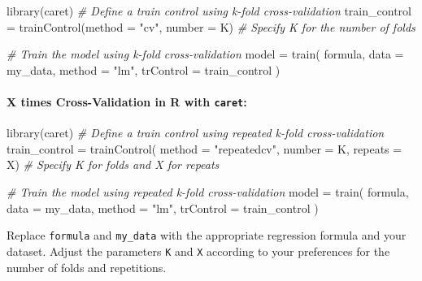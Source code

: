 \documentclass[
]{article}
\newenvironment{Shaded}{}{}
\newcommand{\AttributeTok}[1]{\textcolor[rgb]{0.49,0.56,0.16}{#1}}
\newcommand{\CommentTok}[1]{\textcolor[rgb]{0.38,0.63,0.69}{\textit{#1}}}
\newcommand{\FunctionTok}[1]{\textcolor[rgb]{0.02,0.16,0.49}{#1}}
\newcommand{\NormalTok}[1]{#1}
\newcommand{\OtherTok}[1]{\textcolor[rgb]{0.00,0.44,0.13}{#1}}
\newcommand{\StringTok}[1]{\textcolor[rgb]{0.25,0.44,0.63}{#1}}
\begin{document}
\begin{Shaded}
\begin{Highlighting}[]
\FunctionTok{library}\NormalTok{(caret)}
\CommentTok{\# Define a train control using k{-}fold cross{-}validation}
\NormalTok{train\_control }\OtherTok{=}
	\FunctionTok{trainControl}\NormalTok{(}\AttributeTok{method =} \StringTok{"cv"}\NormalTok{, }\AttributeTok{number =}\NormalTok{ K)  }
\CommentTok{\# Specify K for the number of folds}

\CommentTok{\# Train the model using k{-}fold cross{-}validation}
\NormalTok{model }\OtherTok{=}
	\FunctionTok{train}\NormalTok{(}
\NormalTok{    formula, }
    \AttributeTok{data =}\NormalTok{ my\_data,}
    \AttributeTok{method =} \StringTok{"lm"}\NormalTok{,}
    \AttributeTok{trControl =}\NormalTok{ train\_control}
\NormalTok{  )}
\end{Highlighting}
\end{Shaded}

\hypertarget{x-times-cross-validation-in-r-with-caret}{%
\paragraph{\texorpdfstring{X times Cross-Validation in R with
\texttt{caret}:}{X times Cross-Validation in R with caret:}}\label{x-times-cross-validation-in-r-with-caret}}

\begin{Shaded}
\begin{Highlighting}[]
\FunctionTok{library}\NormalTok{(caret)}
\CommentTok{\# Define a train control using repeated k{-}fold cross{-}validation}
\NormalTok{train\_control }\OtherTok{=}
\FunctionTok{trainControl}\NormalTok{(}
  \AttributeTok{method =} \StringTok{"repeatedcv"}\NormalTok{,}
  \AttributeTok{number =}\NormalTok{ K, }\AttributeTok{repeats =}\NormalTok{ X) }
\CommentTok{\# Specify K for folds and X for repeats}

\CommentTok{\# Train the model using repeated k{-}fold cross{-}validation}
\NormalTok{model }\OtherTok{=}
	\FunctionTok{train}\NormalTok{(}
\NormalTok{    formula,}
    \AttributeTok{data =}\NormalTok{ my\_data,}
    \AttributeTok{method =} \StringTok{"lm"}\NormalTok{,}
    \AttributeTok{trControl =}\NormalTok{ train\_control}
\NormalTok{  )}
\end{Highlighting}
\end{Shaded}

Replace \texttt{formula} and \texttt{my\_data} with the appropriate
regression formula and your dataset. Adjust the parameters \texttt{K}
and \texttt{X} according to your preferences for the number of folds and
repetitions.
\end{document}
